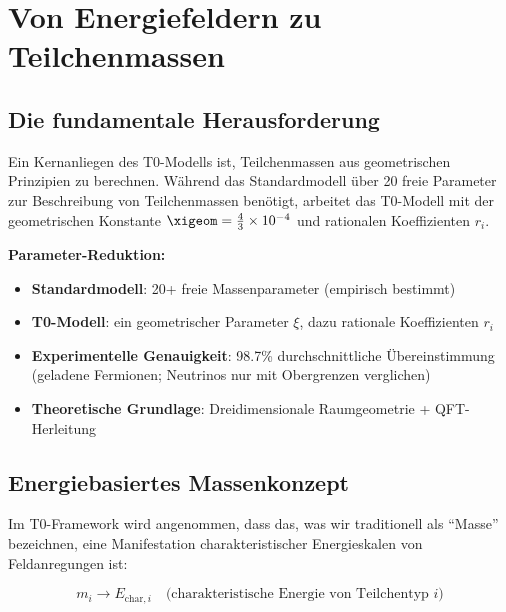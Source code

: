 	\section{Von Energiefeldern zu Teilchenmassen}
	\label{sec:energy_fields_to_masses}
	
	\subsection{Die fundamentale Herausforderung}
	\label{subsec:fundamental_challenge}
	
	Ein Kernanliegen des T0-Modells ist, Teilchenmassen aus geometrischen Prinzipien zu berechnen. Während das Standardmodell über 20 freie Parameter zur Beschreibung von Teilchenmassen benötigt, arbeitet das T0-Modell mit der geometrischen Konstante $\xigeom = \frac{4}{3} \times 10^{-4}$ und rationalen Koeffizienten $r_i$.
	
	\begin{tcolorbox}[colback=green!5!white,colframe=green!75!black,title=Massenbeschreibung]
		\textbf{Parameter-Reduktion:}
		\begin{itemize}
			\item \textbf{Standardmodell}: 20+ freie Massenparameter (empirisch bestimmt)
			\item \textbf{T0-Modell}: ein geometrischer Parameter $\xi$, dazu rationale Koeffizienten $r_i$
			\item \textbf{Experimentelle Genauigkeit}: 98.7\% durchschnittliche Übereinstimmung (geladene Fermionen; Neutrinos nur mit Obergrenzen verglichen)
			\item \textbf{Theoretische Grundlage}: Dreidimensionale Raumgeometrie + QFT-Herleitung
		\end{itemize}
	\end{tcolorbox}
	
	\subsection{Energiebasiertes Massenkonzept}
	\label{subsec:energy_based_mass}
	
	Im T0-Framework wird angenommen, dass das, was wir traditionell als ``Masse'' bezeichnen, eine Manifestation charakteristischer Energieskalen von Feldanregungen ist:
	
	\begin{equation}
		\boxed{m_i \rightarrow E_{\text{char},i} \quad \text{(charakteristische Energie von Teilchentyp } i\text{)}}
		\label{eq:mass_to_energy}
	\end{equation}
	
